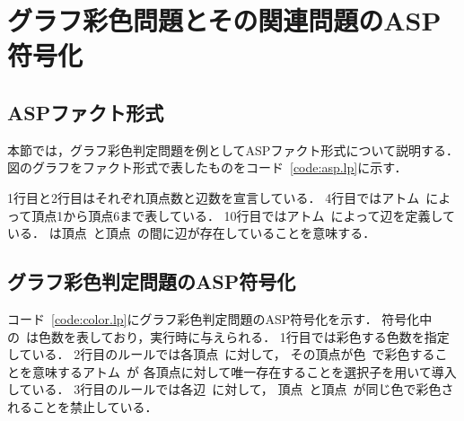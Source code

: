 \chapter{グラフ彩色問題とその関連問題のASP符号化}

\section{ASPファクト形式}



本節では，グラフ彩色判定問題を例としてASPファクト形式について説明する．
図のグラフをファクト形式で表したものをコード~\ref{code:asp.lp}に示す．

1行目と2行目はそれぞれ頂点数と辺数を宣言している．
4行目ではアトム~によって頂点1から頂点6まで表している．
10行目ではアトム~によって辺を定義している．
は頂点~と頂点~の間に辺が存在していることを意味する．

\section{グラフ彩色判定問題のASP符号化}



コード~\ref{code:color.lp}にグラフ彩色判定問題のASP符号化を示す．
符号化中の~は色数を表しており，実行時に与えられる．
1行目では彩色する色数を指定している．
2行目のルールでは各頂点~に対して，
その頂点が色~で彩色することを意味するアトム~が
各頂点に対して唯一存在することを選択子を用いて導入している．
3行目のルールでは各辺~に対して，
頂点~と頂点~が同じ色で彩色されることを禁止している．

